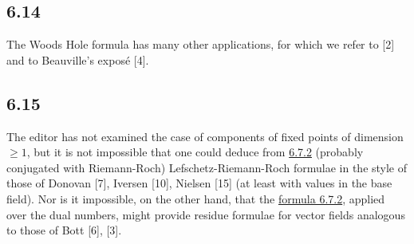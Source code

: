 \documentclass[11pt]{article}
\begin{document}
\subsection*{6.14}\label{sga5:III:subsection:6.14}
The Woods Hole formula has many other applications, for which we refer to [2] and to Beauville's exposé [4].


\subsection*{6.15}\label{sga5:III:subsection:6.15}

The editor has not examined the case of components of fixed points of dimension $\geq1$, but it is not impossible that one could deduce from \hyperref[sga5:III:equation:6.7.2]{6.7.2} (probably conjugated with Riemann-Roch) Lefschetz-Riemann-Roch formulae in the style of those of Donovan [7], Iversen [10], Nielsen [15] (at least with values in the base field). Nor is it impossible, on the other hand, that the \hyperref[sga5:III:equation:6.7.2]{formula 6.7.2}, applied over the dual numbers, might provide residue formulae for vector fields analogous to those of Bott [6], [3].
\end{document}
